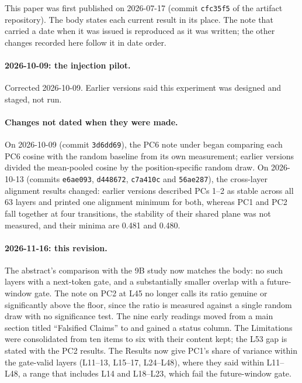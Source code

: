 \documentclass[11pt,a4paper]{article}
\begin{document}
This paper was first published on 2026-07-17 (commit \texttt{cfc35f5} of the artifact repository). The body states each current result in its place. The note that carried a date when it was issued is reproduced as it was written; the other changes recorded here follow it in date order.

\paragraph{2026-10-09: the injection pilot.}
Corrected 2026-10-09. Earlier versions said this experiment was designed and staged, not run.

\paragraph{Changes not dated when they were made.}
On 2026-10-09 (commit \texttt{3d6dd69}), the PC6 note under  began comparing each PC6 cosine with the random baseline from its own measurement; earlier versions divided the mean-pooled cosine by the position-specific random draw. On 2026-10-13 (commits \texttt{e6ae093}, \texttt{d448672}, \texttt{c7a410c} and \texttt{56ae287}), the cross-layer alignment results changed: earlier versions described PCs 1--2 as stable across all 63 layers and printed one alignment minimum for both, whereas PC1 and PC2 fall together at four transitions, the stability of their shared plane was not measured, and their minima are 0.481 and 0.480.

\paragraph{2026-11-16: this revision.}
The abstract's comparison with the 9B study now matches the body: no such layers with a next-token gate, and a substantially smaller overlap with a future-window gate. The note on PC2 at L45 no longer calls its ratio genuine or significantly above the floor, since the ratio is measured against a single random draw with no significance test. The nine early readings moved from a main section titled ``Falsified Claims'' to  and gained a status column. The Limitations were consolidated from ten items to six with their content kept; the L53 gap is stated with the PC2 results. The Results now give PC1's share of variance within the gate-valid layers (L11--13, L15--17, L24--L48), where they said within L11--L48, a range that includes L14 and L18--L23, which fail the future-window gate.
\end{document}
